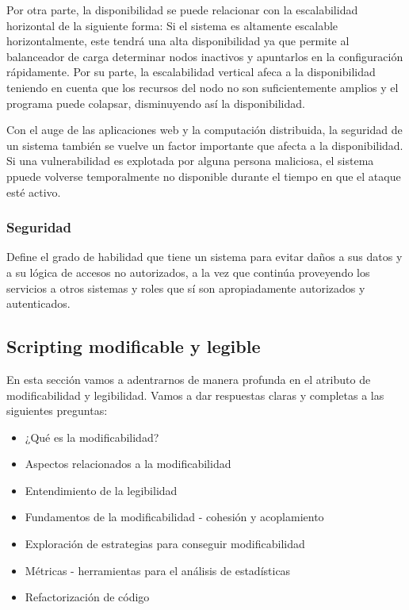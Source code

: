Por otra parte, la disponibilidad se puede relacionar con la escalabilidad horizontal de la siguiente forma: Si el sistema es altamente escalable horizontalmente, este tendrá una alta disponibilidad ya que permite al balanceador de carga determinar nodos inactivos y apuntarlos en la configuración rápidamente. Por su parte, la escalabilidad vertical afeca a la disponibilidad teniendo en cuenta que los recursos del nodo no son suficientemente amplios y el programa puede colapsar, disminuyendo así la disponibilidad. 

Con el auge de las aplicaciones web y la computación distribuida, la seguridad de un sistema también se vuelve un factor importante que afecta a la disponibilidad. Si una vulnerabilidad es
explotada por alguna persona maliciosa, el sistema ppuede volverse temporalmente no disponible durante el tiempo en que el ataque esté activo.

\subsubsection{Seguridad} Define el grado de habilidad que tiene un sistema para evitar daños a sus datos y a su lógica de accesos no autorizados, a la vez que continúa proveyendo los servicios a otros sistemas y roles que sí son apropiadamente autorizados y autenticados.

\subsection{Scripting modificable y legible}

En esta sección vamos a adentrarnos de manera profunda en el atributo de modificabilidad y legibilidad. Vamos a dar respuestas claras y completas a las siguientes preguntas:

\begin{itemize}
    \item ¿Qué es la modificabilidad?
    \item Aspectos relacionados a la modificabilidad
    \item Entendimiento de la legibilidad
    \item Fundamentos de la modificabilidad - cohesión y acoplamiento
    \item Exploración de estrategias para conseguir modificabilidad
    \item Métricas - herramientas para el análisis de estadísticas
    \item Refactorización de código
\end{itemize}

